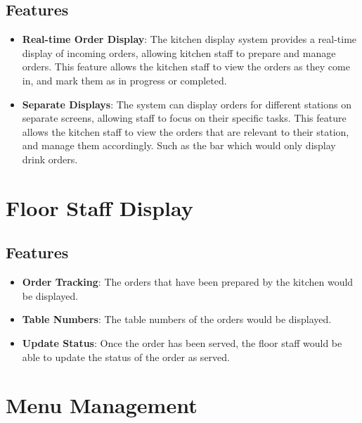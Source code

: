 \subsection{Features}
\begin{itemize}
    \item \textbf{Real-time Order Display}: The kitchen display system provides a real-time display of incoming orders, allowing kitchen staff to prepare and manage orders. This feature allows the kitchen staff to view the orders as they come in, and mark them as in progress or completed.
    \item \textbf{Separate Displays}: The system can display orders for different stations on separate screens, allowing staff to focus on their specific tasks. This feature allows the kitchen staff to view the orders that are relevant to their station, and manage them accordingly. Such as the bar which would only display drink orders.
\end{itemize}

\section{Floor Staff Display}
\subsection{Features}
\begin{itemize}
    \item \textbf{Order Tracking}: The orders that have been prepared by the kitchen would be displayed.
    \item \textbf{Table Numbers}: The table numbers of the orders would be displayed.
    \item \textbf{Update Status}: Once the order has been served, the floor staff would be able to update the status of the order as served.
\end{itemize}

\section{Menu Management}
